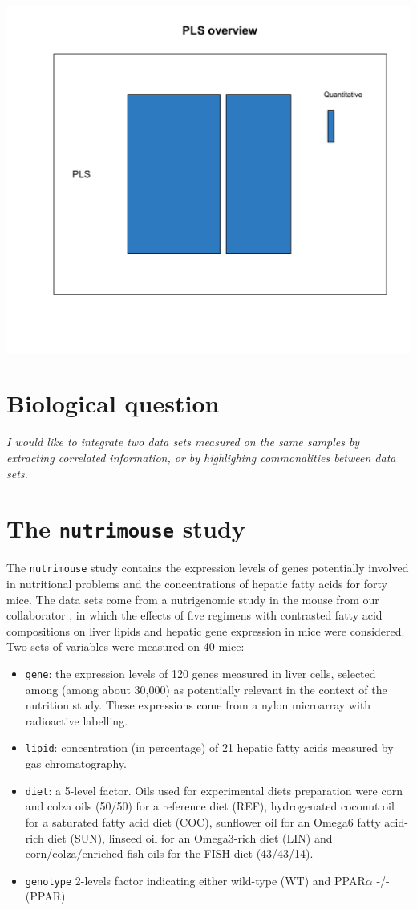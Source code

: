 \documentclass[]{book}
\theoremstyle{definition}
\theoremstyle{definition}
\theoremstyle{definition}
\theoremstyle{remark}
\begin{document}
\begin{center}\includegraphics[width=0.5\linewidth]{Figures/overview-PLS-1} \end{center}

\section{Biological question}\label{biological-question-2}

{ \emph{I would like to integrate two data sets measured on the same
samples by extracting correlated information, or by highlighing
commonalities between data sets.} }

\section{\texorpdfstring{The \texttt{nutrimouse}
study}{The nutrimouse study}}\label{the-nutrimouse-study}

The \texttt{nutrimouse} study contains the expression levels of genes
potentially involved in nutritional problems and the concentrations of
hepatic fatty acids for forty mice. The data sets come from a
nutrigenomic study in the mouse from our collaborator \citep{Mar07}, in
which the effects of five regimens with contrasted fatty acid
compositions on liver lipids and hepatic gene expression in mice were
considered. Two sets of variables were measured on 40 mice:

\begin{itemize}
\item
  \texttt{gene}: the expression levels of 120 genes measured in liver
  cells, selected among (among about 30,000) as potentially relevant in
  the context of the nutrition study. These expressions come from a
  nylon microarray with radioactive labelling.
\item
  \texttt{lipid}: concentration (in percentage) of 21 hepatic fatty
  acids measured by gas chromatography.
\item
  \texttt{diet}: a 5-level factor. Oils used for experimental diets
  preparation were corn and colza oils (50/50) for a reference diet
  (REF), hydrogenated coconut oil for a saturated fatty acid diet (COC),
  sunflower oil for an Omega6 fatty acid-rich diet (SUN), linseed oil
  for an Omega3-rich diet (LIN) and corn/colza/enriched fish oils for
  the FISH diet (43/43/14).
\item
  \texttt{genotype} 2-levels factor indicating either wild-type (WT) and
  PPAR\(\alpha\) -/- (PPAR).
\end{itemize}
\end{document}
